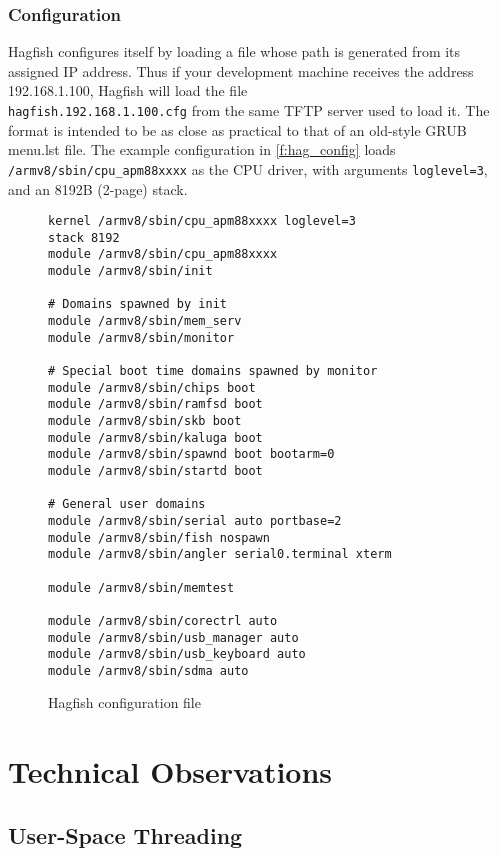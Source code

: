 \documentclass[a4paper,twoside]{report}
\begin{document}
\subsection{Configuration}

Hagfish configures itself by loading a file whose path is generated from its
assigned IP address. Thus if your development machine receives the address
192.168.1.100, Hagfish will load the file\\
\texttt{hagfish.192.168.1.100.cfg}
from the same TFTP server used to load it. The format is intended to be as
close as practical to that of an old-style GRUB menu.lst file. The example
configuration in \autoref{f:hag_config} loads
\texttt{/armv8/sbin/cpu\_apm88xxxx} as the CPU driver, with arguments
\texttt{loglevel=3}, and an 8192B (2-page) stack.

\begin{figure}[htb]
\begin{center}
\begin{lstlisting}
kernel /armv8/sbin/cpu_apm88xxxx loglevel=3
stack 8192
module /armv8/sbin/cpu_apm88xxxx
module /armv8/sbin/init

# Domains spawned by init
module /armv8/sbin/mem_serv
module /armv8/sbin/monitor

# Special boot time domains spawned by monitor
module /armv8/sbin/chips boot
module /armv8/sbin/ramfsd boot
module /armv8/sbin/skb boot
module /armv8/sbin/kaluga boot
module /armv8/sbin/spawnd boot bootarm=0
module /armv8/sbin/startd boot

# General user domains
module /armv8/sbin/serial auto portbase=2
module /armv8/sbin/fish nospawn
module /armv8/sbin/angler serial0.terminal xterm

module /armv8/sbin/memtest

module /armv8/sbin/corectrl auto
module /armv8/sbin/usb_manager auto
module /armv8/sbin/usb_keyboard auto
module /armv8/sbin/sdma auto
\end{lstlisting}
\end{center}
\caption{Hagfish configuration file}
\label{f:hag_config}
\end{figure}

\chapter{Technical Observations}\label{c:tech}

\section{User-Space Threading}\label{s:threads}
\end{document}
